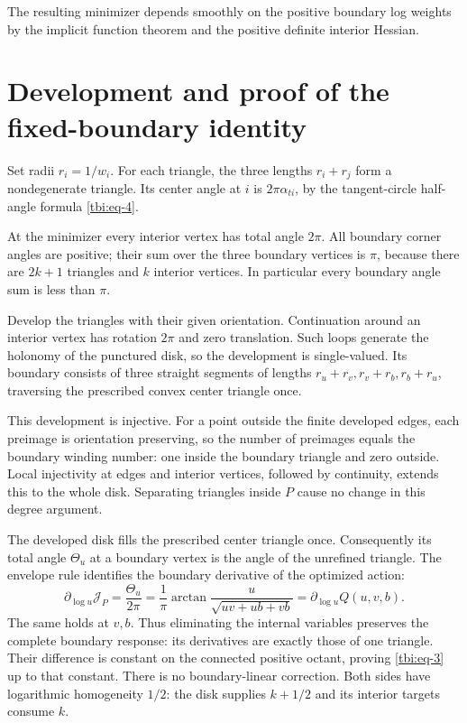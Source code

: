 The resulting minimizer depends smoothly on the positive boundary log weights by the implicit function theorem and the positive definite interior Hessian.

\section{Development and proof of the fixed-boundary identity}\label{tbi:sec-3}

Set radii \(r_i=1/w_i\). For each triangle, the three lengths \(r_i+r_j\) form a nondegenerate triangle. Its center angle at \(i\) is \(2\pi\alpha_{ti}\), by the tangent-circle half-angle formula \eqref{tbi:eq-4}.

At the minimizer every interior vertex has total angle \(2\pi\). All boundary corner angles are positive; their sum over the three boundary vertices is \(\pi\), because there are \(2k+1\) triangles and \(k\) interior vertices. In particular every boundary angle sum is less than \(\pi\).

Develop the triangles with their given orientation. Continuation around an interior vertex has rotation \(2\pi\) and zero translation. Such loops generate the holonomy of the punctured disk, so the development is single-valued. Its boundary consists of three straight segments of lengths \(r_u+r_v,r_v+r_b,r_b+r_u\), traversing the prescribed convex center triangle once.

This development is injective. For a point outside the finite developed edges, each preimage is orientation preserving, so the number of preimages equals the boundary winding number: one inside the boundary triangle and zero outside. Local injectivity at edges and interior vertices, followed by continuity, extends this to the whole disk. Separating triangles inside \(P\) cause no change in this degree argument.

The developed disk fills the prescribed center triangle once.
Consequently its total angle \(\Theta_u\) at a boundary vertex is
the angle of the unrefined triangle. The envelope rule identifies the
boundary derivative of the optimized action:
\begin{equation}\label{tbi:eq-8}
\partial_{\log u}\mathcal J_P
=\frac{\Theta_u}{2\pi}
=\frac1\pi\arctan\frac{u}{\sqrt{uv+ub+vb}}
=\partial_{\log u}Q(u,v,b).
\end{equation}
The same holds at \(v,b\). Thus eliminating the internal variables
preserves the complete boundary response: its derivatives are exactly
those of one triangle. Their difference is constant on the connected
positive octant, proving \eqref{tbi:eq-3} up to that constant.
There is no boundary-linear correction. Both sides have logarithmic
homogeneity \(1/2\): the disk supplies \(k+1/2\) and its interior
targets consume \(k\).

